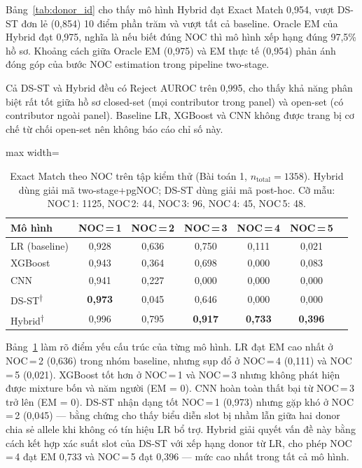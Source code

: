 \documentclass[12pt,a4paper]{article}
\begin{document}
Bảng~\ref{tab:donor_id} cho thấy mô hình Hybrid đạt Exact Match 0,954, vượt DS-ST đơn lẻ (0,854) 10 điểm phần trăm và vượt tất cả baseline. Oracle EM của Hybrid đạt 0,975, nghĩa là nếu biết đúng NOC thì mô hình xếp hạng đúng 97,5\% hồ sơ. Khoảng cách giữa Oracle EM (0,975) và EM thực tế (0,954) phản ánh đóng góp của bước NOC estimation trong pipeline two-stage.

Cả DS-ST và Hybrid đều có Reject AUROC trên 0,995, cho thấy khả năng phân biệt rất tốt giữa hồ sơ closed-set (mọi contributor trong panel) và open-set (có contributor ngoài panel). Baseline LR, XGBoost và CNN không được trang bị cơ chế từ chối open-set nên không báo cáo chỉ số này.

\begin{table}[H]
\centering
\caption{Exact Match theo NOC trên tập kiểm thử (Bài toán 1, $n_{\mathrm{total}}=1358$). Hybrid dùng giải mã two-stage+pgNOC; DS-ST dùng giải mã post-hoc. Cỡ mẫu: NOC\,1: 1125, NOC\,2: 44, NOC\,3: 96, NOC\,4: 45, NOC\,5: 48.}
\label{tab:donor_id_pernoc}
\footnotesize
\begin{adjustbox}{max width=\textwidth}
\begin{tabular}{lcccccc}
\toprule
\textbf{Mô hình} & \textbf{NOC\,=\,1} & \textbf{NOC\,=\,2} & \textbf{NOC\,=\,3} & \textbf{NOC\,=\,4} & \textbf{NOC\,=\,5} \\
\midrule
LR (baseline)   & 0,928 & 0,636 & 0,750 & 0,111 & 0,021 \\
XGBoost         & 0,943 & 0,364 & 0,698 & 0,000 & 0,083 \\
CNN             & 0,941 & 0,227 & 0,000 & 0,000 & 0,000 \\
DS-ST\textsuperscript{†}  & \textbf{0,973} & 0,045 & 0,646 & 0,000 & 0,000 \\
Hybrid\textsuperscript{†} & 0,996 & 0,795 & \textbf{0,917} & \textbf{0,733} & \textbf{0,396} \\
\bottomrule
\end{tabular}
\end{adjustbox}
\end{table}

Bảng~\ref{tab:donor_id_pernoc} làm rõ điểm yếu cấu trúc của từng mô hình. LR đạt EM cao nhất ở NOC\,=\,2 (0,636) trong nhóm baseline, nhưng sụp đổ ở NOC\,=\,4 (0,111) và NOC\,=\,5 (0,021). XGBoost tốt hơn ở NOC\,=\,1 và NOC\,=\,3 nhưng không phát hiện được mixture bốn và năm người (EM = 0). CNN hoàn toàn thất bại từ NOC\,=\,3 trở lên (EM = 0). DS-ST nhận dạng tốt NOC\,=\,1 (0,973) nhưng gặp khó ở NOC\,=\,2 (0,045) — bằng chứng cho thấy biểu diễn slot bị nhầm lẫn giữa hai donor chia sẻ allele khi không có tín hiệu LR bổ trợ. Hybrid giải quyết vấn đề này bằng cách kết hợp xác suất slot của DS-ST với xếp hạng donor từ LR, cho phép NOC\,=\,4 đạt EM 0,733 và NOC\,=\,5 đạt 0,396 — mức cao nhất trong tất cả mô hình.
\end{document}
